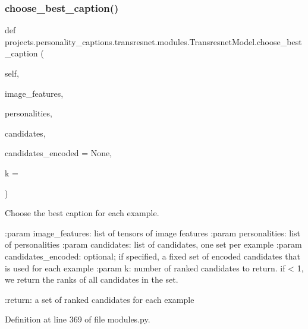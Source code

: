 \subsubsection{\texorpdfstring{choose\+\_\+best\+\_\+caption()}{choose\_best\_caption()}}
{\footnotesize\ttfamily def projects.\+personality\+\_\+captions.\+transresnet.\+modules.\+Transresnet\+Model.\+choose\+\_\+best\+\_\+caption (\begin{DoxyParamCaption}\item[{}]{self,  }\item[{}]{image\+\_\+features,  }\item[{}]{personalities,  }\item[{}]{candidates,  }\item[{}]{candidates\+\_\+encoded = {\ttfamily None},  }\item[{}]{k = {} }\end{DoxyParamCaption})}

\begin{DoxyVerb}Choose the best caption for each example.

:param image_features:
    list of tensors of image features
:param personalities:
    list of personalities
:param candidates:
    list of candidates, one set per example
:param candidates_encoded:
    optional; if specified, a fixed set of encoded candidates that is
    used for each example
:param k:
    number of ranked candidates to return. if < 1, we return the ranks
    of all candidates in the set.

:return:
    a set of ranked candidates for each example
\end{DoxyVerb}
 

Definition at line 369 of file modules.\+py.


